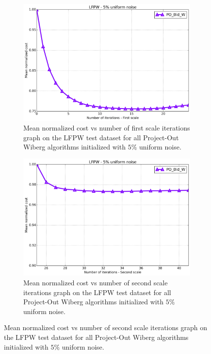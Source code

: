 \begin{figure}[p]
\begin{subfigure}{0.48\textwidth}
	\end{subfigure}
	\par\bigskip\bigskip
	\begin{subfigure}{0.48\textwidth}
	    \includegraphics[width=\textwidth]{experiments/algorithms/po_w/mean_cost_vs_iters1_po_w_5.png}
	    \caption{Mean normalized cost vs number of first scale iterations graph on the LFPW test dataset for all Project-Out Wiberg algorithms initialized with $5\%$ uniform noise.}
	    \label{fig:mean_cost_vs_iters1_bpo_w_5}
	\end{subfigure}
	\hfill
	\begin{subfigure}{0.48\textwidth}
	    \includegraphics[width=\textwidth]{experiments/algorithms/po_w/mean_cost_vs_iters2_po_w_5.png}
	    \caption{Mean normalized cost vs number of second scale iterations graph on the LFPW test dataset for all Project-Out Wiberg algorithms initialized with $5\%$ uniform noise.}

\end{subfigure}
\end{figure}
